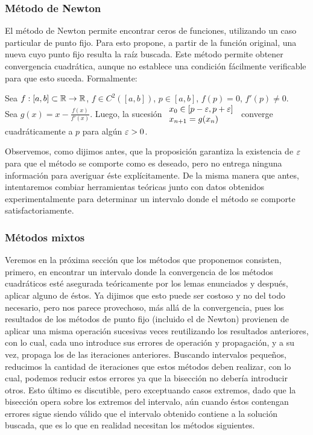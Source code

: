 \subsubsection{Método de Newton}
El método de Newton permite encontrar ceros de funciones, utilizando un caso particular de punto fijo. Para esto propone, a partir de la función original, una nueva cuyo punto fijo resulta la raíz buscada. Este método permite obtener convergencia cuadrática, aunque no establece una condición fácilmente verificable para que esto suceda. Formalmente:
\begin{prop} 
Sea $f: [a,b] \subset \mathbb{R} \rightarrow \mathbb{R}$, $f \in C^{2}([a,b])$, $p\in[a,b]$, $f(p) = 0$, $f'(p) \neq 0$. \\
Sea $g(x) = x - \displaystyle\frac{f(x)}{f'(x)}$. Luego, la sucesión 
	$\begin{array}{l}
		x_0 \in [p-\varepsilon, p+\varepsilon] \\
		x_{n+1} = g(x_n)
	 \end{array}$
converge cuadráticamente a $p$ para algún  $\varepsilon > 0$.
\label{prop_newton}
\end{prop}

Observemos, como dijimos antes, que la proposición garantiza la existencia de $\varepsilon$ para que el método se comporte como es deseado, pero no entrega ninguna información para averiguar éste explícitamente. De la misma manera que antes, intentaremos combiar herramientas teóricas junto con datos obtenidos experimentalmente para determinar un intervalo donde el método se comporte satisfactoriamente.

\subsubsection{Métodos mixtos}
Veremos en la próxima sección que los métodos que proponemos consisten, primero, en encontrar un intervalo donde la convergencia de los métodos cuadráticos esté asegurada teóricamente por los lemas enunciados y después, aplicar alguno de éstos. Ya dijimos que esto puede ser costoso y no del todo necesario, pero nos parece provechoso, más allá de la convergencia, pues los resultados de los métodos de punto fijo (incluido el de Newton) provienen de aplicar una misma operación sucesivas veces reutilizando los resultados anteriores, con lo cual, cada uno introduce sus errores de operación y propagación, y a su vez, propaga los de las iteraciones anteriores. Buscando intervalos pequeños, reducimos la cantidad de iteraciones que estos métodos deben realizar, con lo cual, podemos reducir estos errores ya que la bisección no debería introducir otros. Esto último es discutible, pero exceptuando casos extremos, dado que la bisección opera sobre los extremos del intervalo, aún cuando éstos contengan errores sigue siendo válido que el intervalo obtenido contiene a la solución buscada, que es lo que en realidad necesitan los métodos siguientes.



